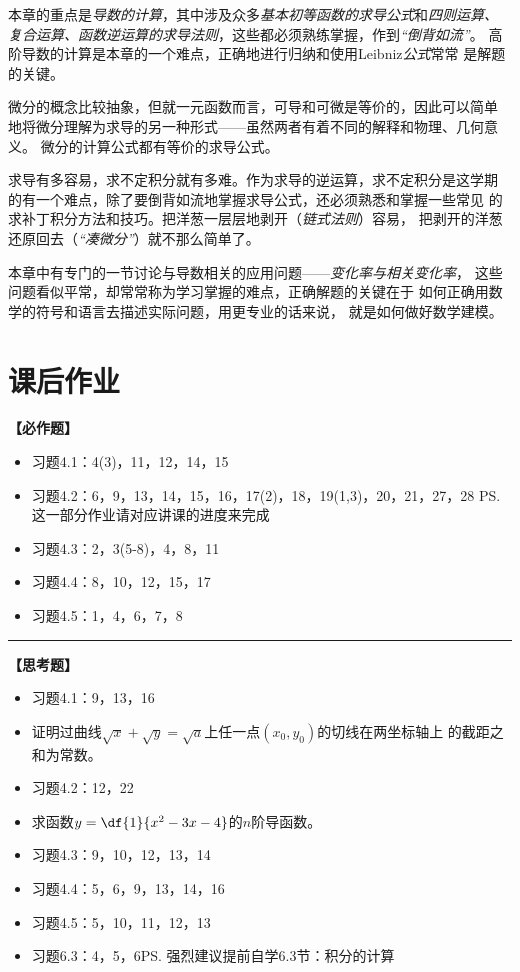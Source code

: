 本章的重点是{\it 导数的计算}，其中涉及众多{\it 基本初等函数的求导公式}和{\it 四则运算、
复合运算、函数逆运算的求导法则}，这些都必须熟练掌握，作到{\it “倒背如流”}。
高阶导数的计算是本章的一个难点，正确地进行归纳和使用Leibniz{\it 公式}常常
是解题的关键。

微分的概念比较抽象，但就一元函数而言，可导和可微是等价的，因此可以简单
地将微分理解为求导的另一种形式——虽然两者有着不同的解释和物理、几何意义。
微分的计算公式都有等价的求导公式。

求导有多容易，求不定积分就有多难。作为求导的逆运算，求不定积分是这学期
的有一个难点，除了要倒背如流地掌握求导公式，还必须熟悉和掌握一些常见
的求补丁积分方法和技巧。把洋葱一层层地剥开（{\it 链式法则}）容易，
把剥开的洋葱还原回去（{\it “凑微分”}）就不那么简单了。

本章中有专门的一节讨论与导数相关的应用问题——{\it 变化率与相关变化率}，
这些问题看似平常，却常常称为学习掌握的难点，正确解题的关键在于
如何正确用数学的符号和语言去描述实际问题，用更专业的话来说，
就是如何做好数学建模。

\newpage

\section*{课后作业}

{\bf 【必作题】}

\begin{itemize}
  \item 习题4.1：4(3)，11，12，14，15
  \item 习题4.2：6，9，13，14，15，16，17(2)，18，19(1,3)，20，21，27，28
  \ps{这一部分作业请对应讲课的进度来完成}
  \item 习题4.3：2，3(5-8)，4，8，11
  \item 习题4.4：8，10，12，15，17
  \item 习题4.5：1，4，6，7，8
\end{itemize}

\bigskip

\hrule

\bigskip
\bigskip

{\bf 【思考题】}

\begin{itemize}
  \item 习题4.1：9，13，16
  \item 证明过曲线$\sqrt x+\sqrt y=\sqrt a$上任一点$(x_0,y_0)$的切线在两坐标轴上
		的截距之和为常数。
  \item 习题4.2：12，22
  \item 求函数$y=\df{1}{x^2-3x-4}$的$n$阶导函数。
  \item 习题4.3：9，10，12，13，14
  \item 习题4.4：5，6，9，13，14，16
  \item 习题4.5：5，10，11，12，13
  \item 习题6.3：4，5，6\ps{强烈建议提前自学6.3节：积分的计算}
\end{itemize}

